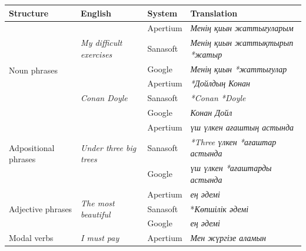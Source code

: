 \documentclass[11pt]{article}
\begin{document}
\begin{table}
  \centering
  \begin{tabular}{|l|l|l|l|}
    \hline 
    \textbf{Structure} & \textbf{English} & \textbf{System} & \textbf{Translation} \\
    \hline 
    \multirow{6}{*}{Noun phrases} & \multirow{3}{*}{\emph{My difficult exercises}} & Apertium & \emph{Менің қиын жаттығуларым} \\
                                  &                                         & Sanasoft & \emph{Менің қиын жаттықтырып *жатыр} \\ %
                                  &                                         & Google   & \emph{Менің қиын *жаттығулар} \\ %
                                  & \multirow{3}{*}{\emph{Conan Doyle}}            & Apertium & \emph{*Дойлдың Конан} \\
                                  &                                         & Sanasoft & \emph{*Conan *Doyle} \\ %
                                  &                                         & Google   & \emph{Конан Дойл} \\ %
    \hline 
    \multirow{3}{*}{Adpositional phrases}  & \multirow{3}{*}{\emph{Under three big trees}}  & Apertium & \emph{үш үлкен ағаштың астында} \\
                                           &                                         & Sanasoft & \emph{*Three үлкен *ағаштар астында} \\ %
                                           &                                         & Google   & \emph{үш үлкен *ағаштарды астында} \\ %
    \hline 
    \multirow{3}{*}{Adjective phrases}    & \multirow{3}{*}{\emph{The most beautiful}}      & Apertium & \emph{ең әдемі} \\ 
                                          &                                          & Sanasoft & *\emph{Көпшілік әдемі} \\ %
                                          &                                          & Google   & \emph{ең әдемі} \\
    \hline
    \multirow{6}{*}{Modal verbs}  & \multirow{3}{*}{\emph{I must pay}}             & Apertium & \emph{Мен жүргізе аламын} \\

\end{tabular}
\end{table}
\end{document}

